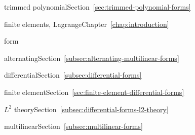 \par\noindent\hspace*{1em}\label{index:finite-element-space-trimmed-polynomial}{trimmed polynomial}\quad Section~\ref{sec:trimmed-polynomial-forms}

\par\noindent\hspace*{0em}\label{index:finite-elements-lagrange}{finite elements, Lagrange}\quad Chapter~\ref{chap:introduction}

\par\noindent\hspace*{0em}\label{index:form}{form}

\par\noindent\hspace*{1em}\label{index:form-alternating}{alternating}\quad Section~\ref{subsec:alternating-multilinear-forms}

\par\noindent\hspace*{1em}\label{index:form-differential}{differential}\quad Section~\ref{subsec:differential-forms}

\par\noindent\hspace*{2em}\label{index:form-differential-finite-element}{finite element}\quad Section~\ref{sec:finite-element-differential-forms}

\par\noindent\hspace*{2em}\label{index:form-differential-l-2-theory}{$L^2$ theory}\quad Section~\ref{subsec:differential-forms-l2-theory}

\par\noindent\hspace*{1em}\label{index:form-multilinear}{multilinear}\quad Section~\ref{subsec:multilinear-forms}

